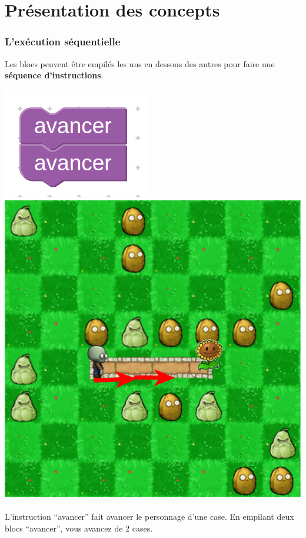 \documentclass{beamer}
\begin{document}
\section{Présentation des concepts}

\begin{frame}
	\frametitle{L'exécution séquentielle}

	Les blocs peuvent être empilés les uns en dessous des autres
	pour faire une \textbf{séquence d'instructions}.

	\includegraphics[width=0.45\linewidth]{blocks_2moveForward.png}
	\includegraphics[width=0.45\linewidth]{visualization_2moveForward.png}

	L'instruction \enquote{avancer} fait avancer le personnage d'une case. En empilant
	deux blocs \enquote{avancer}, vous avancez de 2 cases.
\end{frame}
\end{document}
